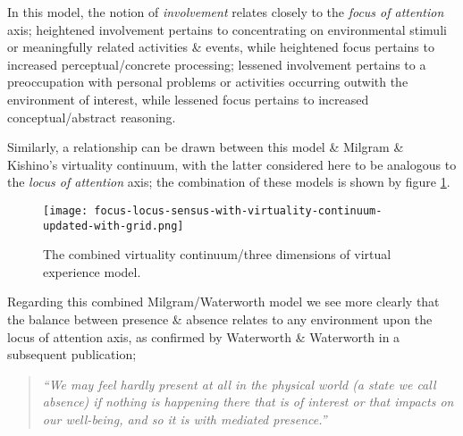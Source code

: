 In this model, the notion of \textit{involvement} relates closely to the \textit{focus of attention} axis; heightened involvement pertains to concentrating on environmental stimuli or meaningfully related activities \& events, while heightened focus pertains to increased perceptual/concrete processing; lessened involvement pertains to a preoccupation with personal problems or activities occurring outwith the environment of interest, while lessened focus pertains to increased conceptual/abstract reasoning.

Similarly, a relationship can be drawn between this model \& Milgram \& Kishino's virtuality continuum, with the latter considered here to be analogous to the \textit{locus of attention} axis; the combination of these models is shown by figure \ref{focus-locus-sensus-with-virtuality-continuum}.

\begin{figure}[h]
	\begin{center}
		\texttt{[image: focus-locus-sensus-with-virtuality-continuum-updated-with-grid.png]}
		\caption{The combined virtuality continuum/three dimensions of virtual experience model.}
		\label{focus-locus-sensus-with-virtuality-continuum}
	\end{center}	
\end{figure}

Regarding this combined Milgram/Waterworth model we see more clearly that the balance between presence \& absence relates to any environment upon the locus of attention axis, as confirmed by Waterworth \& Waterworth in a subsequent publication;

\begin{quote}
	\textit{``We may feel hardly present at all in the physical world (a state we call absence) if nothing is happening there that is of interest or that impacts on our well-being, and so it is with mediated presence.''}~\cite{Waterworth2014}
\end{quote}




